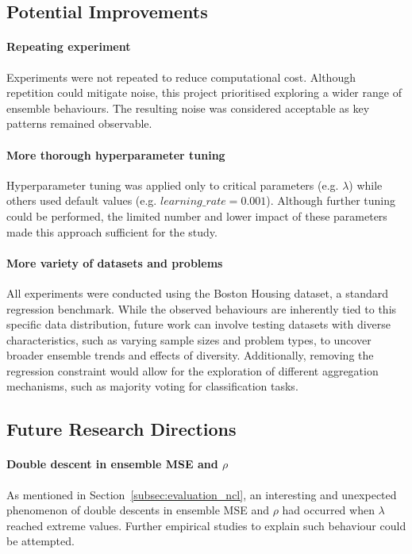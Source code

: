\subsection{Potential Improvements}
\paragraph{Repeating experiment}
Experiments were not repeated to reduce computational cost. Although repetition could mitigate noise, this project prioritised exploring a wider range of ensemble behaviours. The resulting noise was considered acceptable as key patterns remained observable. 

\paragraph{More thorough hyperparameter tuning}
Hyperparameter tuning was applied only to critical parameters (e.g. $\lambda$) while others used default values (e.g. $learning\_rate = 0.001$). Although further tuning could be performed, the limited number and lower impact of these parameters made this approach sufficient for the study. 

\paragraph{More variety of datasets and problems}
All experiments were conducted using the Boston Housing dataset, a standard regression benchmark. While the observed behaviours are inherently tied to this specific data distribution, future work can involve testing datasets with diverse characteristics, such as varying sample sizes and problem types, to uncover broader ensemble trends and effects of diversity. Additionally, removing the regression constraint would allow for the exploration of different aggregation mechanisms, such as majority voting for classification tasks. 


\subsection{Future Research Directions}
\paragraph{Double descent in ensemble MSE and $\rho$}
As mentioned in Section~\ref{subsec:evaluation_ncl}, an interesting and unexpected phenomenon of double descents in ensemble MSE and $\rho$ had occurred when $\lambda$ reached extreme values. Further empirical studies to explain such behaviour could be attempted. 

